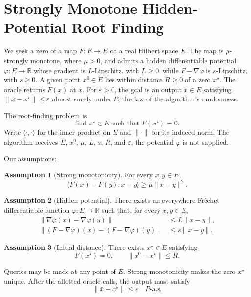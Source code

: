 \documentclass[10pt]{article}
\theoremstyle{definition}
\newtheorem{assumption}{Assumption}
\begin{document}
\section*{Strongly Monotone Hidden-Potential Root Finding}
We seek a zero of a map $F:E\to E$ on a real Hilbert space $E$. The map is $\mu$-strongly monotone, where $\mu>0$, and admits a hidden differentiable potential $\varphi:E\to\mathbb{R}$ whose gradient is $L$-Lipschitz, with $L\geq0$, while $F-\nabla\varphi$ is $s$-Lipschitz, with $s\geq0$. A given point $x^0\in E$ lies within distance $R\geq0$ of a zero $x^\star$. The oracle returns $F(x)$ at $x$. For $\varepsilon>0$, the goal is an output $\bar{x}\in E$ satisfying $\|\bar{x}-x^\star\|\leq\varepsilon$ almost surely under $P$, the law of the algorithm's randomness.

The root-finding problem is
\[
\text{find }x^\star\in E\text{ such that }F(x^\star)=0.
\]
Write $\langle\cdot,\cdot\rangle$ for the inner product on $E$ and $\|\cdot\|$ for its induced norm. The algorithm receives $E$, $x^0$, $\mu$, $L$, $s$, $R$, and $\varepsilon$; the potential $\varphi$ is not supplied.

Our assumptions:
\begin{assumption}[Strong monotonicity]
For every $x,y\in E$,
\[
\langle F(x)-F(y),x-y\rangle
\geq \mu\|x-y\|^2.
\]
\end{assumption}

\begin{assumption}[Hidden potential]
There exists an everywhere Fr\'echet differentiable function $\varphi:E\to\mathbb{R}$ such that, for every $x,y\in E$,
\[
\begin{aligned}
\|\nabla\varphi(x)-\nabla\varphi(y)\|
&\leq L\|x-y\|,\\
\|(F-\nabla\varphi)(x)-(F-\nabla\varphi)(y)\|
&\leq s\|x-y\|.
\end{aligned}
\]
\end{assumption}

\begin{assumption}[Initial distance]
There exists $x^\star\in E$ satisfying
\[
F(x^\star)=0,
\qquad \|x^0-x^\star\|\leq R.
\]
\end{assumption}

Queries may be made at any point of $E$. Strong monotonicity makes the zero $x^\star$ unique. After the allotted oracle calls, the output must satisfy
\[
\|\bar{x}-x^\star\|\leq\varepsilon
\quad P\text{-a.s.}
\]
\end{document}
